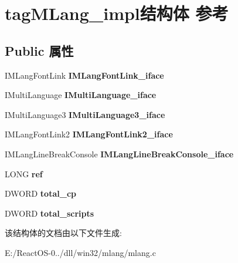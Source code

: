 \hypertarget{structtag_m_lang__impl}{}\section{tag\+M\+Lang\+\_\+impl结构体 参考}
\label{structtag_m_lang__impl}
\subsection*{Public 属性}
\begin{DoxyCompactItemize}
\item 
\mbox{\label{structtag_m_lang__impl_aa32c789048854ea05abc1dcd7ffbb9a1}} 
I\+M\+Lang\+Font\+Link {\bfseries I\+M\+Lang\+Font\+Link\+\_\+iface}
\item 
\mbox{\label{structtag_m_lang__impl_ae3b5829c72053c1548995a19caa1570e}} 
I\+Multi\+Language {\bfseries I\+Multi\+Language\+\_\+iface}
\item 
\mbox{\label{structtag_m_lang__impl_abced307699eb21adbb5f911bfa169b31}} 
I\+Multi\+Language3 {\bfseries I\+Multi\+Language3\+\_\+iface}
\item 
\mbox{\label{structtag_m_lang__impl_a276a852dce89b1a4af35207659e6a505}} 
I\+M\+Lang\+Font\+Link2 {\bfseries I\+M\+Lang\+Font\+Link2\+\_\+iface}
\item 
\mbox{\label{structtag_m_lang__impl_a6e37e5b8da61908aa204180565f97277}} 
I\+M\+Lang\+Line\+Break\+Console {\bfseries I\+M\+Lang\+Line\+Break\+Console\+\_\+iface}
\item 
\mbox{\label{structtag_m_lang__impl_afa8eebd1be2ed303f12aa7f3e2e58069}} 
L\+O\+NG {\bfseries ref}
\item 
\mbox{\label{structtag_m_lang__impl_a0e4f55c9b2bb136596aaf87dfe534646}} 
D\+W\+O\+RD {\bfseries total\+\_\+cp}
\item 
\mbox{\label{structtag_m_lang__impl_accec9aac9be4b34adc3f447617f23c16}} 
D\+W\+O\+RD {\bfseries total\+\_\+scripts}
\end{DoxyCompactItemize}


该结构体的文档由以下文件生成\+:\begin{DoxyCompactItemize}
\item 
E\+:/\+React\+O\+S-\/0../dll/win32/mlang/mlang.\+c\end{DoxyCompactItemize}
